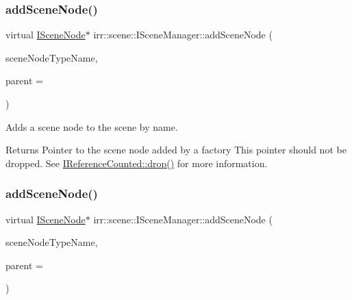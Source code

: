 \subsubsection{\texorpdfstring{add\+Scene\+Node()}{addSceneNode()}\hspace{0.1cm}{\footnotesize\ttfamily [1/2]}}
{\footnotesize\ttfamily virtual \hyperlink{classirr_1_1scene_1_1ISceneNode}{I\+Scene\+Node}$\ast$ irr\+::scene\+::\+I\+Scene\+Manager\+::add\+Scene\+Node (\begin{DoxyParamCaption}\item[{const char $\ast$}]{scene\+Node\+Type\+Name,  }\item[{\hyperlink{classirr_1_1scene_1_1ISceneNode}{I\+Scene\+Node} $\ast$}]{parent = {} }\end{DoxyParamCaption})\hspace{0.3cm}{\ttfamily [pure virtual]}}



Adds a scene node to the scene by name. 

\begin{DoxyReturn}{Returns}
Pointer to the scene node added by a factory This pointer should not be dropped. See \hyperlink{classirr_1_1IReferenceCounted_a03856a09355b89d178090c4a5f738543}{I\+Reference\+Counted\+::drop()} for more information. 
\end{DoxyReturn}
\mbox{\label{classirr_1_1scene_1_1ISceneManager_a22ea17e8c06a773af9828f7bb70cdc40}} 
\subsubsection{\texorpdfstring{add\+Scene\+Node()}{addSceneNode()}\hspace{0.1cm}{\footnotesize\ttfamily [2/2]}}
{\footnotesize\ttfamily virtual \hyperlink{classirr_1_1scene_1_1ISceneNode}{I\+Scene\+Node}$\ast$ irr\+::scene\+::\+I\+Scene\+Manager\+::add\+Scene\+Node (\begin{DoxyParamCaption}\item[{const char $\ast$}]{scene\+Node\+Type\+Name,  }\item[{\hyperlink{classirr_1_1scene_1_1ISceneNode}{I\+Scene\+Node} $\ast$}]{parent = {} }\end{DoxyParamCaption})\hspace{0.3cm}{\ttfamily [pure virtual]}}



